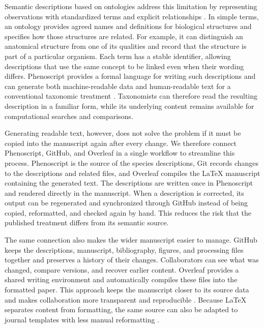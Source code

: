 Semantic descriptions based on ontologies address this limitation by representing observations with standardized terms and explicit relationships \citep{balhoff2013semantic, deans2015phenotypes}. In simple terms, an ontology provides agreed names and definitions for biological structures and specifies how those structures are related. For example, it can distinguish an anatomical structure from one of its qualities and record that the structure is part of a particular organism. Each term has a stable identifier, allowing descriptions that use the same concept to be linked even when their wording differs. Phenoscript provides a formal language for writing such descriptions and can generate both machine-readable data and human-readable text for a conventional taxonomic treatment \citep{montanaro2024beyond, montanaro2024computable}. Taxonomists can therefore read the resulting description in a familiar form, while its underlying content remains available for computational searches and comparisons.

Generating readable text, however, does not solve the problem if it must be copied into the manuscript again after every change. We therefore connect Phenoscript, GitHub, and Overleaf in a single workflow to streamline this process. Phenoscript is the source of the species descriptions, Git records changes to the descriptions and related files, and Overleaf compiles the \LaTeX{} manuscript containing the generated text. The descriptions are written once in Phenoscript and rendered directly in the manuscript. When a description is corrected, its output can be regenerated and synchronized through GitHub instead of being copied, reformatted, and checked again by hand. This reduces the risk that the published treatment differs from its semantic source.

The same connection also makes the wider manuscript easier to manage. GitHub keeps the descriptions, manuscript, bibliography, figures, and processing files together and preserves a history of their changes. Collaborators can see what was changed, compare versions, and recover earlier content. Overleaf provides a shared writing environment and automatically compiles these files into the formatted paper. This approach keeps the manuscript closer to its source data and makes collaboration more transparent and reproducible \citep{ram2013git, braga2023github, himmelstein2020open}. Because \LaTeX{} separates content from formatting, the same source can also be adapted to journal templates with less manual reformatting \citep{bar2021reproducible, krewinkel2017formatting}.

